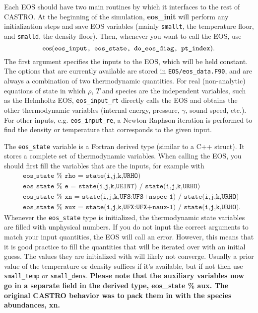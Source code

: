 Each EOS should have two main routines by which it interfaces to the rest of CASTRO.
At the beginning of the simulation, {\bf \rm eos\_init} will perform any initialization steps and save EOS variables (mainly \texttt{smallt}, the temperature floor, and \texttt{smalld}, the density floor). Then, whenever you want to call the EOS, use
\[
{\bf \rm eos}(\texttt{eos\_input, eos\_state, do\_eos\_diag, pt\_index}).
\]
The first argument specifies the inputs to the EOS, which will be held constant. The options that are currently available are stored in \texttt{EOS/eos\_data.F90}, and are always a combination of two thermodynamic quantities. For real (non-analytic) equations of state in which $\rho$, $T$ and species are the independent variables, such as the Helmholtz EOS, \texttt{eos\_input\_rt} directly calls the EOS and obtains the other thermodynamic variables (internal energy, pressure, $\gamma$, sound speed, etc.). For other inputs, e.g. \texttt{eos\_input\_re}, a Newton-Raphson iteration is performed to find the density or temperature that corresponds to the given input.

The \texttt{eos\_state} variable is a Fortran derived type (similar to a C++ struct). It stores a complete set of thermodynamic variables. When calling the EOS, you should first fill the variables that are the inputs, for example with
\begin{align*}
  &\texttt{eos\_state } \% \texttt{ rho = state(i,j,k,URHO)} \\
  &\texttt{eos\_state } \% \texttt{ e   = state(i,j,k,UEINT) / state(i,j,k,URHO)} \\
  &\texttt{eos\_state } \% \texttt{ xn  = state(i,j,k,UFS:UFS+nspec-1) / state(i,j,k,URHO)} \\
  &\texttt{eos\_state } \% \texttt{ aux = state(i,j,k,UFX:UFX+naux-1) / state(i,j,k,URHO)}.
\end{align*}
Whenever the \texttt{eos\_state} type is initialized, the thermodynamic state variables are filled with unphysical numbers. If you do not input the correct arguments to match your input quantities, the EOS will call an error. However, this means that it is good practice to fill the quantities that will be iterated over with an initial guess. The values they are initialized with will likely not converge. Usually a prior value of the temperature or density suffices if it's available, but if not then use \texttt{small\_temp} or \texttt{small\_dens}. \textbf{Please note that the auxiliary variables now go in a separate field in the derived type, eos\_state \% aux. The original CASTRO behavior was to pack them in with the species abundances, xn.}

